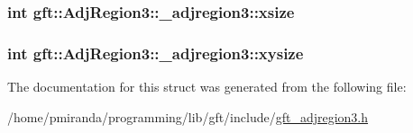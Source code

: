 \subsubsection[{\texorpdfstring{xsize}{xsize}}]{\setlength{\rightskip}{0pt plus 5cm}int gft\+::\+Adj\+Region3\+::\+\_\+adjregion3\+::xsize}\hypertarget{structgft_1_1AdjRegion3_1_1__adjregion3_a4037356e2aa308226792442cbc1f7754}{}\label{structgft_1_1AdjRegion3_1_1__adjregion3_a4037356e2aa308226792442cbc1f7754}
\subsubsection[{\texorpdfstring{xysize}{xysize}}]{\setlength{\rightskip}{0pt plus 5cm}int gft\+::\+Adj\+Region3\+::\+\_\+adjregion3\+::xysize}\hypertarget{structgft_1_1AdjRegion3_1_1__adjregion3_ad70bcfe7793b3d3468b3360339f1a1ff}{}\label{structgft_1_1AdjRegion3_1_1__adjregion3_ad70bcfe7793b3d3468b3360339f1a1ff}


The documentation for this struct was generated from the following file\+:\begin{DoxyCompactItemize}
\item 
/home/pmiranda/programming/lib/gft/include/\hyperlink{gft__adjregion3_8h}{gft\+\_\+adjregion3.\+h}\end{DoxyCompactItemize}
